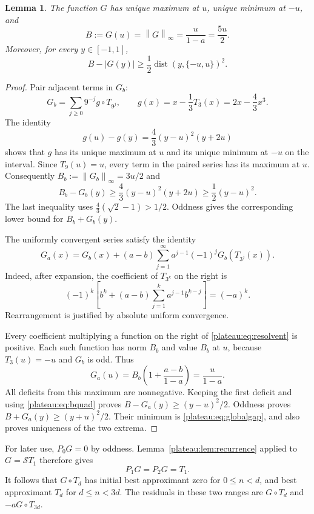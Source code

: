 \documentclass[11pt]{article}
\newtheorem{lemma}[theorem]{Lemma}
\theoremstyle{remark}\newtheorem{remark}[theorem]{Remark}
\newcommand{\norm}[1]{\left\lVert #1\right\rVert_\infty}
\newcommand{\dist}{\operatorname{dist}}
\begin{document}
\begin{lemma}\label{plateau:lem:baseline}
The function $G$ has unique maximum at $u$, unique minimum at $-u$, and
\begin{equation}\label{plateau:eq:B}
 B:=G(u)=\norm G=\frac{u}{1-a}=\frac{5u}{2}.
\end{equation}
Moreover, for every $y\in[-1,1]$,
\begin{equation}\label{plateau:eq:globalgap}
 B-|G(y)|\ge\frac12\dist(y,\{-u,u\})^2.
\end{equation}
\end{lemma}
\begin{proof}
Pair adjacent terms in $G_b$:
\[
 G_b=\sum_{j\ge0}9^{-j}g\circ T_{9^j},
 \qquad g(x)=x-\frac13T_3(x)=2x-\frac43x^3.
\]
The identity
\[
 g(u)-g(y)=\frac43(y-u)^2(y+2u)
\]
shows that $g$ has its unique maximum at $u$ and its unique minimum at
$-u$ on the interval. Since $T_9(u)=u$, every term in the paired series
has its maximum at $u$. Consequently $B_b:=\norm{G_b}=3u/2$ and
\begin{equation}\label{plateau:eq:bquad}
 B_b-G_b(y)\ge\frac43(y-u)^2(y+2u)\ge\frac12(y-u)^2.
\end{equation}
The last inequality uses $\frac43(\sqrt2-1)>1/2$. Oddness gives the
corresponding lower bound for $B_b+G_b(y)$.

The uniformly convergent series satisfy the identity
\begin{equation}\label{plateau:eq:resolvent}
 G_a(x)=G_b(x)+(a-b)\sum_{j=1}^{\infty}
 a^{j-1}(-1)^jG_b(T_{3^j}(x)).
\end{equation}
Indeed, after expansion, the coefficient of $T_{3^k}$ on the right is
\[
 (-1)^k\left[b^k+(a-b)\sum_{j=1}^k a^{j-1}b^{k-j}\right]=(-a)^k.
\]
Rearrangement is justified by absolute uniform convergence.

Every coefficient multiplying a function on the right of
\eqref{plateau:eq:resolvent} is positive. Each such function has norm $B_b$ and
value $B_b$ at $u$, because $T_3(u)=-u$ and $G_b$ is odd. Thus
\[
 G_a(u)=B_b\left(1+\frac{a-b}{1-a}\right)=\frac{u}{1-a}.
\]
All deficits from this maximum are nonnegative. Keeping the first deficit
and using \eqref{plateau:eq:bquad} proves
$B-G_a(y)\ge(y-u)^2/2$. Oddness proves
$B+G_a(y)\ge(y+u)^2/2$. Their minimum is
\eqref{plateau:eq:globalgap}, and also proves uniqueness of the two extrema.
\end{proof}

For later use, $P_0G=0$ by oddness. Lemma~\ref{plateau:lem:recurrence} applied to
$G=\mathcal S T_1$ therefore gives
\begin{equation}\label{plateau:eq:Gsmall}
 P_1G=P_2G=T_1.
\end{equation}
It follows that $G\circ T_d$ has initial best approximant zero for
$0\le n<d$, and best approximant $T_d$ for $d\le n<3d$. The residuals
in these two ranges are $G\circ T_d$ and $-aG\circ T_{3d}$.
\end{document}
